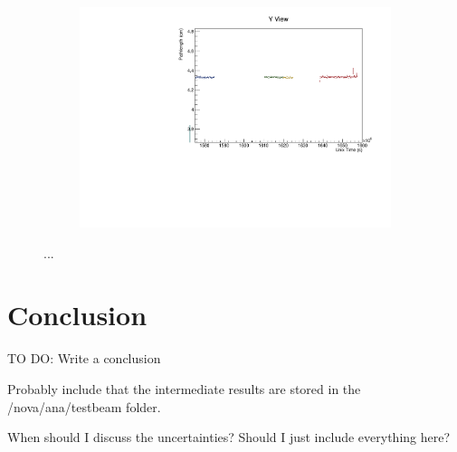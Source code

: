 \documentclass[12pt,a4paper]{article}
\begin{document}
\begin{figure}[!ht]
\begin{subfigure}{0.5\textwidth}
  \end{subfigure}
  \begin{subfigure}{0.5\textwidth}
    \includegraphics[width=\linewidth]{driftsec_tb/cm_time_y.pdf}
  \end{subfigure}
  \caption{...}
  \label{figAbsCalibDrift2}
\end{figure}

\FloatBarrier
\section{Conclusion}
TO DO: Write a conclusion

Probably include that the intermediate results are stored in the /nova/ana/testbeam folder.

When should I discuss the uncertainties? Should I just include everything here?



\end{document}
